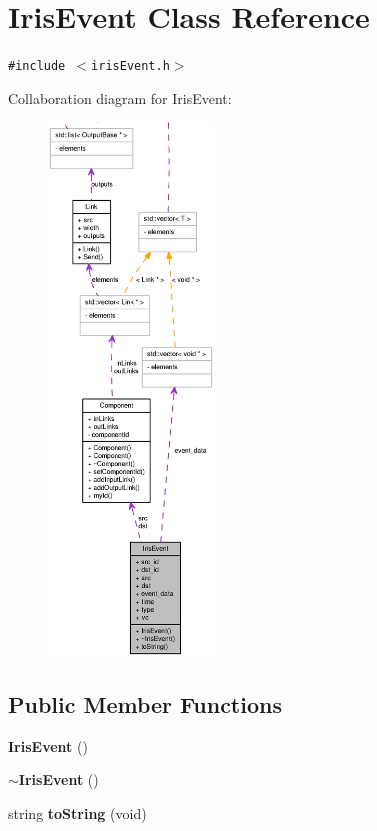 \section{IrisEvent Class Reference}
\label{classIrisEvent}
{\tt \#include $<$irisEvent.h$>$}

Collaboration diagram for IrisEvent:\nopagebreak
\begin{figure}[H]
\begin{center}
\leavevmode
\includegraphics[height=400pt]{classIrisEvent__coll__graph}
\end{center}
\end{figure}
\subsection*{Public Member Functions}
\begin{CompactItemize}
\item 
{\bf IrisEvent} ()
\item 
{\bf $\sim$IrisEvent} ()
\item 
string {\bf toString} (void)
\end{CompactItemize}
